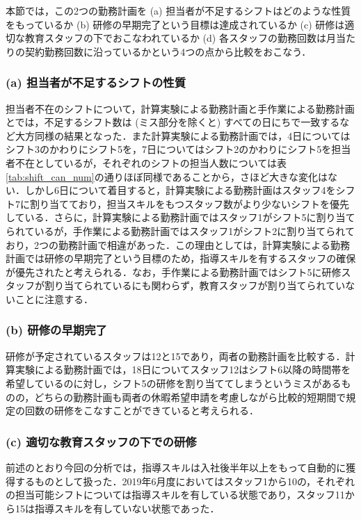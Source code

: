 \documentclass[11pt]{jsarticle}
\begin{document}
本節では，この2つの勤務計画を (a) 担当者が不足するシフトはどのような性質をもっているか (b) 研修の早期完了という目標は達成されているか (c) 研修は適切な教育スタッフの下でおこなわれているか (d) 各スタッフの勤務回数は月当たりの契約勤務回数に沿っているかという4つの点から比較をおこなう．

\vspace{\baselineskip}
\subsubsection*{(a) 担当者が不足するシフトの性質}
担当者不在のシフトについて，計算実験による勤務計画と手作業による勤務計画とでは，不足するシフト数は (ミス部分を除くと) すべての日にちで一致するなど大方同様の結果となった．また計算実験による勤務計画では，4日についてはシフト3のかわりにシフト5を，7日についてはシフト2のかわりにシフト5を担当者不在としているが，それぞれのシフトの担当人数については表\ref{tab:shift_can_num}の通りほぼ同様であることから，さほど大きな変化はない．しかし6日について着目すると，計算実験による勤務計画はスタッフ4をシフト7に割り当てており，担当スキルをもつスタッフ数がより少ないシフトを優先している．さらに，計算実験による勤務計画ではスタッフ1がシフト5に割り当てられているが，手作業による勤務計画ではスタッフ1がシフト2に割り当てられており，2つの勤務計画で相違があった．この理由としては，計算実験による勤務計画では研修の早期完了という目標のため，指導スキルを有するスタッフの確保が優先されたと考えられる．なお，手作業による勤務計画ではシフト5に研修スタッフが割り当てられているにも関わらず，教育スタッフが割り当てられていないことに注意する．

\vspace{\baselineskip}
\subsubsection*{(b) 研修の早期完了}
研修が予定されているスタッフは12と15であり，両者の勤務計画を比較する．計算実験による勤務計画では，18日についてスタッフ12はシフト6以降の時間帯を希望しているのに対し，シフト5の研修を割り当ててしまうというミスがあるものの，どちらの勤務計画も両者の休暇希望申請を考慮しながら比較的短期間で規定の回数の研修をこなすことができていると考えられる．

\vspace{\baselineskip}
\subsubsection*{(c) 適切な教育スタッフの下での研修}
前述のとおり今回の分析では，指導スキルは入社後半年以上をもって自動的に獲得するものとして扱った．2019年6月度においてはスタッフ1から10の，それぞれの担当可能シフトについては指導スキルを有している状態であり，スタッフ11から15は指導スキルを有していない状態であった．
\end{document}
